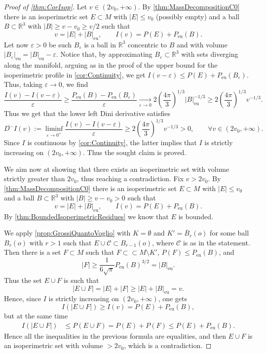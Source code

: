\documentclass[a4paper,12pt,reqno]{amsart}
\numberwithin{equation}{section}
\theoremstyle{plain}
\theoremstyle{definition}
\theoremstyle{remark}
\newcommand{\eps}{\varepsilon}
\begin{document}
{\begin{proof}[Proof of \cref{thm:CorIsop}]
Let $v\in (2v_0,+\infty)$. By \cref{thm:MassDecompositionC0} there is an isoperimetric set $E\subset M$ with $|E|\leq v_0$ (possibly empty) and a ball $B\subset \mathbb R^3$ with $|B|\geq v-v_0 \geq v/2$ such that 
\[
v=|E|+|B|_{\mathrm{eu}},\qquad I(v)=P(E)+P_{\mathrm{eu}}(B).
\]
Let now $\varepsilon>0$ be such $B_\varepsilon$ is a ball in $\mathbb{R}^3$ concentric to $B$ and with volume $|B_\varepsilon|_{\mathrm{eu}}=|B|_{\mathrm{eu}}-\varepsilon$. Notice that, by approximating $B_\varepsilon\subset \mathbb R^3$ with sets diverging along the manifold, arguing as in the proof of the upper bound for the isoperimetric profile in \cref{cor:Continuity}, we get $I(v-\varepsilon)\leq P(E)+P_{\mathrm{eu}}(B_\varepsilon)$. Thus, taking $\varepsilon\to0$, we find
\[
\frac{I(v)-I(v-\varepsilon)}{\varepsilon} \geq \frac{P_{\mathrm{eu}}(B)-P_{\mathrm{eu}}(B_\varepsilon)}{\varepsilon}
\xrightarrow[\eps\to 0]{}
 2 \left(\frac{4\pi}{3}\right)^{1/3}|B|_{\mathrm{eu}}^{-1/3}
 \geq 2 \left(\frac{4\pi}{3}\right)^{1/3}v^{-1/3}.
\]
    Thus we get that the lower left Dini derivative satisfies
    \[
    \overline{D^-} I(v):=\liminf_{\varepsilon\to 0^+} \frac{I(v)-I(v-\varepsilon)}{\varepsilon} \geq 2 \left(\frac{4\pi}{3}\right)^{1/3}v^{-1/3} 
    >0, \qquad \forall v\in (2v_0,+\infty).
    \]
    Since $I$ is continuous by \cref{cor:Continuity},  the latter implies that $I$ is strictly increasing on $(2v_0,+\infty)$. Thus the sought claim is proved.

    We aim now at showing that there exists an isoperimetric set with volume strictly greater than $2v_0$, thus reaching a contradiction. Fix $v>2v_0$. By \cref{thm:MassDecompositionC0} there is an isoperimetric set $E\subset M$ with $|E|\leq v_0$ and a ball $B\subset \mathbb R^3$ with $|B|\geq v-v_0>0$ such that 
\[
v=|E|+|B|_{\mathrm{eu}},\qquad I(v)=P(E)+P_{\mathrm{eu}}(B).
\]
By \cref{thm:BoundedIsoperimetricResidues} we know that $E$ is bounded. 

We apply \cref{prop:GrossiQuantoVoglio} with $K=\emptyset$ and $K'=\overline{B}_r(o)$ for some ball $B_r(o)$ with $r>1$ such that $E\cup \mathcal{C} \subset B_{r-1}(o)$, where $\mathcal{C}$ is as in the statement. Then there is a set $F\subset M$ such that $F\subset\subset M\setminus K'$, $P(F)\leq P_{\mathrm{eu}}(B)$, and 
\[
|F|\geq \frac{1}{6\sqrt{\pi}}P_{\mathrm{eu}}(B)^{3/2} = |B|_{\mathrm{eu}}.
\]
 Thus the set $E\cup F$ is such that 
\[
|E\cup F| = |E|+|F| \geq |E|+|B|_{\mathrm{eu}} = v.
\]
Hence, since $I$ is strictly increasing on $(2v_0,+\infty)$, one gets
\[
I(|E\cup F|) \geq I(v) = P(E)+P_{\mathrm{eu}}(B),
\]
but at the same time
\[
\begin{split}
I(|E\cup F|) &\leq P(E\cup F)=P(E)+P(F)\leq P(E)+P_{\mathrm{eu}}(B).
\end{split}
\]
Hence all the inequalities in the previous formula are equalities, and then $E\cup F$ is an isoperimetric set with volume $>2v_0$, which is a contradiction. 
\smallskip


\end{proof}}
\end{document}
